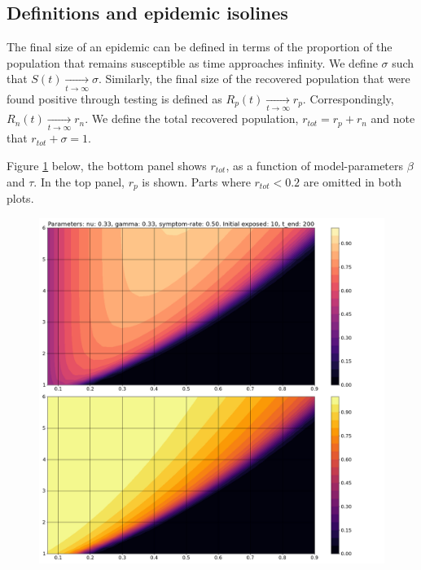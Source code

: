 \documentclass[10pt,a4paper]{article}
\begin{document}
\subsection{Definitions and epidemic isolines}
The final size of an epidemic can be defined in terms of the proportion of the population that remains susceptible as time approaches infinity. 
We define $\sigma$ such that $S(t) \underset{t\rightarrow \infty}{\rightarrow} \sigma$. 
Similarly, the final size of the recovered population that were found positive through testing is defined as $R_p(t) \underset{t\rightarrow \infty}{\rightarrow} r_p$. 
Correspondingly, $R_n(t) \underset{t\rightarrow \infty}{\rightarrow} r_n$.  
We define the total recovered population, $r_{tot} = r_p + r_n$ and note that $r_{tot} + \sigma = 1$.

Figure \ref{fig:TestAndBeta} below, the bottom panel shows $r_{tot}$, as a function of model-parameters $\beta$ and $\tau$. 
In the top panel, $r_p$ is shown. Parts where $r_{tot} < 0.2$ are omitted in both plots.

\begin{figure}[h]\centering
    \includegraphics[width = \linewidth]{./../Figures/TestingModelling_TestProbAndInfectivity_Split.png}
    \caption{ }\label{fig:TestAndBeta}
\end{figure}
\end{document}
